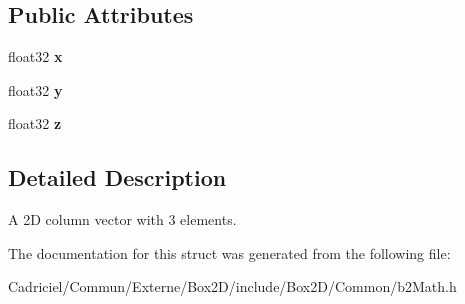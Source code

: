 \subsection*{Public Attributes}
\begin{DoxyCompactItemize}
\item 
float32 {\bfseries x}\hypertarget{structb2_vec3_aedc5e37849caa413a8e767fc47741db2}{}\label{structb2_vec3_aedc5e37849caa413a8e767fc47741db2}

\item 
float32 {\bfseries y}\hypertarget{structb2_vec3_af5a7e99d13d02ff9abb323838d44d3b1}{}\label{structb2_vec3_af5a7e99d13d02ff9abb323838d44d3b1}

\item 
float32 {\bfseries z}\hypertarget{structb2_vec3_a7cb88968ff10fa500df0b10f5c425536}{}\label{structb2_vec3_a7cb88968ff10fa500df0b10f5c425536}

\end{DoxyCompactItemize}


\subsection{Detailed Description}
A 2D column vector with 3 elements. 

The documentation for this struct was generated from the following file\+:\begin{DoxyCompactItemize}
\item 
Cadriciel/\+Commun/\+Externe/\+Box2\+D/include/\+Box2\+D/\+Common/b2\+Math.\+h\end{DoxyCompactItemize}
